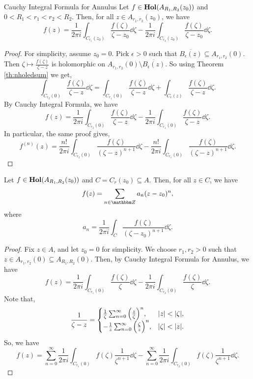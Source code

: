\documentclass[../ComplexAnalysis_Notes.tex]{subfiles}
\begin{document}
\begin{Thm}{Cauchy Integral Formula for Annulus}{}
  Let \(f \in \operatorname{\mathbf{Hol}}(A_{R_1, R_2}(z_0))\) and \(0 < R_1 < r_1 < r_2 < R_2\). Then, for all \(z \in A_{r_1, r_2}(z_0)\), we have
  \[
    f(z) = \frac{1}{2\pi i} \int_{C_{r_1}(z_0)} \frac{f(\zeta)}{\zeta - z_0} \dd{\zeta} - \frac{1}{2\pi i} \int_{C_{r_2}(z_0)} \frac{f(\zeta)}{\zeta - z_0} \dd{\zeta}.
  \]
\end{Thm}
\begin{proof}
  For simplicity, assume \(z_0 = 0\). Pick \(\epsilon > 0\) such that \(\overline{B_{\epsilon}(z)} \subseteq A_{r_1, r_2}(0)\). Then \(\zeta \mapsto \frac{f(\zeta)}{\zeta - z}\) is holomorphic on \(A_{r_1, r_2}(0) \setminus \overline{B_{\epsilon}(z)}\). So using Theorem \ref{th:nholedsum} we get,
  \[
    \int_{C_{r_2}(0)} \frac{f(\zeta)}{\zeta - z} \dd{\zeta} = \int_{C_{r_1}(0)} \frac{f(\zeta)}{\zeta - z} \dd{\zeta} + \int_{C_{\epsilon}(z)} \frac{f(\zeta)}{\zeta - z} \dd{\zeta}.
  \]
  By Cauchy Integral Formula, we have
  \[
    f(z) = \frac{1}{2\pi i} \int_{C_{r_2}(0)} \frac{f(\zeta)}{\zeta - z} \dd{\zeta} - \frac{1}{2\pi i} \int_{C_{r_1}(0)} \frac{f(\zeta)}{\zeta - z} \dd{\zeta}.
  \]
  In particular, the same proof gives,
  \[
    f^{(n)}(z) = \frac{n!}{2\pi i} \int_{C_{r_2}(0)} \frac{f(\zeta)}{(\zeta - z)^{n + 1}} \dd{\zeta} - \frac{n!}{2\pi i} \int_{C_{r_1}(0)} \frac{f(\zeta)}{(\zeta - z)^{n + 1}} \dd{\zeta}.
  \]
\end{proof}


\begin{Thm}{}{}
  Let \(f \in \operatorname{\mathbf{Hol}}(A_{R_1, R_2}(z_0))\) and \(C = C_r(z_0) \subseteq A\). Then, for all \(z \in C\), we have
  \[
    f(z) = \sum_{n \in \Z} a_n (z - z_0)^n,
  \]
  where
  \[
    a_n = \frac{1}{2 \pi i} \int_{C} \frac{f(\zeta)}{(\zeta - z_0)^{n + 1}} \dd{\zeta}.
  \]
\end{Thm}
\begin{proof}
  Fix \(z \in A\), and let \(z_0 = 0\) for simplicity. We choose \(r_1, r_2 > 0\) such that \(z \in A_{r_1, r_2}(0) \subseteq A_{R_1, R_2}(0)\). Then, by Cauchy Integral Formula for Annulus, we have
  \[
    f(z) = \frac{1}{2\pi i} \int_{C_{r_1}(0)} \frac{f(\zeta)}{\zeta} \dd{\zeta} - \frac{1}{2\pi i} \int_{C_{r_2}(0)} \frac{f(\zeta)}{\zeta} \dd{\zeta}.
  \]
  Note that,
  \[
    \frac{1}{\zeta - z}
    = \begin{cases}
      \frac{1}{\zeta} \sum_{n = 0}^{\infty} \qty(\frac{z}{\zeta})^n, & \abs{z} < \abs{\zeta},  \\
      -\frac{1}{z} \sum_{n = 0}^{\infty} \qty(\frac{\zeta}{z})^n,    & \abs{\zeta} < \abs{z}.
    \end{cases}
  \]
  So, we have
  \[
    f(z) = \sum_{n = 0}^{\infty} \frac{1}{2\pi i} \int_{C_{r_1}(0)} f(\zeta) \frac{1}{\zeta^{n + 1}} \dd{\zeta} - \sum_{n = 0}^{\infty} \frac{1}{2\pi i} \int_{C_{r_2}(0)} f(\zeta) \frac{1}{\zeta^{n + 1}} \dd{\zeta}.
  \]
\end{proof}
\end{document}
